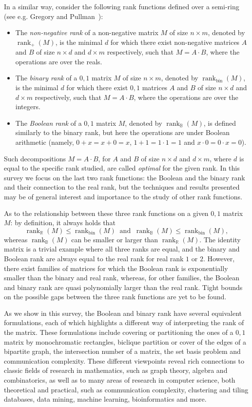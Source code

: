\documentclass[11pt]{article}
\newcommand{\rank}{\mathop{\mathrm{rank}}}
\newcommand{\Rbool}{{\rank}_\mathbb{B}}
\newcommand{\Rbin}{{\rank}_{\mathrm{bin}}}
\newcommand{\Rreal}{{\rank}_\mathbb{R}}
\newcommand{\Rnon}{{\rank}_{+}}
\begin{document}
In a similar way, consider the following rank functions defined over a semi-ring (see e.g. Gregory and Pullman~\cite{GregoryPullman}):
\begin{itemize}
\item
The {\em non-negative rank} of a non-negative matrix $M$  of size $n\times m$, denoted by $\Rnon(M)$,
is the minimal $d$ for which there exist non-negative matrices $A$ and $B$ of size $n \times d$ and $d \times m$ respectively,
such that $M = A \cdot B$, where the operations are over the reals.
\item The {\em binary rank} of a $0,1$ matrix $M$ of size $n\times m$, denoted by $\Rbin(M)$, is
the minimal $d$ for which there exist $0,1$ matrices $A$ and $B$ of size $n \times d$ and $d \times m$ respectively, such that $M = A \cdot B$, where the operations are over the integers.
\item The {\em Boolean rank} of a $0,1$ matrix  $M$, denoted by $\Rbool(M)$, is defined similarly to the binary rank, but here the operations are under Boolean arithmetic
  (namely, $0+x=x+0=x$, $1+1=1 \cdot 1 = 1$ and $x \cdot 0 = 0 \cdot x = 0$).
\end{itemize}
Such decompositions $M=A \cdot B$, for $A$ and $B$ of size $n \times d$ and $d \times m$, where $d$ is equal to the specific rank studied,
are called {\em optimal} for the given rank.
In this survey we focus on the last two rank functions: the Boolean and the binary rank and their connection to the real rank, but the techniques
and results presented may be of general interest and importance to the study of other rank functions.

As to the relationship between these three rank functions on a given $0,1$ matrix $M$: by definition, it always holds that
$$\Rreal(M) \leq \Rbin(M) \;\; \text{and} \;\; \Rbool(M) \leq \Rbin(M),$$
whereas $\Rbool(M)$ can be smaller or larger than $\Rreal(M)$.
The identity matrix is a trivial example where all three ranks are equal,
and the binary and Boolean rank are always equal to the real rank for real rank $1$ or $2$.
However, there exist families of matrices for which the Boolean rank is exponentially smaller than the binary and real rank,
whereas, for other families, the Boolean and binary rank are quasi polynomially larger than the real rank.
Tight bounds on the possible gaps between the three rank functions are yet to be found.

As we show in this survey, the Boolean and binary rank have several equivalent formulations,
each of which highlights a different way of interpreting the rank of the matrix.
These formulations include covering or partitioning the ones of a $0,1$ matrix by monochromatic rectangles,
biclique partition or cover of the edges of a bipartite graph, the intersection number of a matrix, the set basis problem and communication complexity.
These different viewpoints reveal rich connections to classic fields of research in mathematics, such as graph theory, algebra and combinatorics,
as well as to many areas of research in computer science, both theoretical and practical, such as
communication complexity, clustering and tiling databases, data mining, machine learning, bioinformatics and more.
\end{document}
